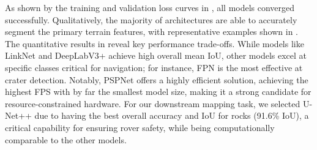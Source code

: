 As shown by the training and validation loss curves in , all models converged successfully. Qualitatively, the majority of architectures are able to accurately segment the primary terrain features, with representative examples shown in . The quantitative results in  reveal key performance trade-offs. While models like LinkNet and DeepLabV3+ achieve high overall mean IoU, other models excel at specific classes critical for navigation; for instance, FPN is the most effective at crater detection. Notably, PSPNet offers a highly efficient solution, achieving the highest FPS with by far the smallest model size, making it a strong candidate for resource-constrained hardware.
For our downstream mapping task, we selected U-Net++ due to having the best overall accuracy and IoU for rocks (91.6\% IoU), a critical capability for ensuring rover safety, while being computationally comparable to the other models.

